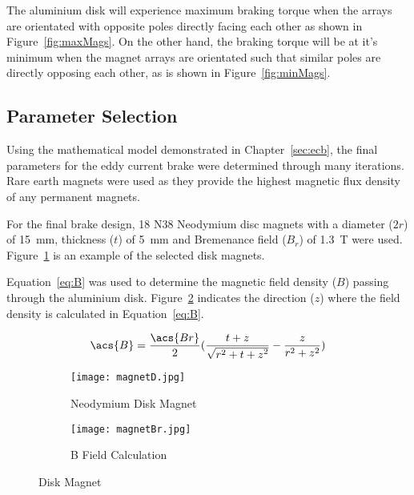 \vspace*{-0.5cm}

The aluminium disk will experience maximum braking torque when the arrays are orientated with opposite poles directly facing each other as shown in Figure~\ref{fig:maxMags}. On the other hand, the braking torque will be at it's minimum when the magnet arrays are orientated such that similar poles are directly opposing each other, as is shown in Figure~\ref{fig:minMags}.

\subsection{Parameter Selection}

Using the mathematical model demonstrated in Chapter~\ref{sec:ecb}, the final parameters for the eddy current brake were determined through many iterations. Rare earth magnets were used as they provide the highest magnetic flux density of any permanent magnets.

For the final brake design, 18 N38 Neodymium disc magnets with a diameter ($2r$) of \SI{15}{\milli\meter}, thickness ($t$) of \SI{5}{\milli\meter} and Bremenance field ($B_r$) of \SI{1.3}{\tesla} were used. Figure~\ref{fig:magN} is an example of the selected disk magnets. 

Equation~\ref{eq:B} was used to determine the magnetic field density ($B$) passing through the aluminium disk. Figure~\ref{fig:B0} indicates the direction ($z$) where the field density is calculated in Equation~\ref{eq:B}.

\begin{equation}
	\acs{B} = \frac{\acs{Br}}{2} (\frac{t+ z}{\sqrt{r^2 + {t + z}^2}} - \frac{z}{r^2 + z^2})
	\label{eq:B}
\end{equation}

\begin{figure}[H]
	\centering
	\begin{subfigure}{.4\textwidth}
		\centering
		\texttt{[image: magnetD.jpg]}
		\caption{Neodymium Disk Magnet}
		\label{fig:magN}
	\end{subfigure}%
\hfill
	\begin{subfigure}{.4\textwidth}
		\centering
		\texttt{[image: magnetBr.jpg]}
		\caption{\ac{B} Field Calculation}
		\label{fig:B0}
	\end{subfigure}
	\caption{Disk Magnet}
	\citep[Addapted from][]{Supermagnete:2010}
	\label{fig:magnets}
\end{figure}

